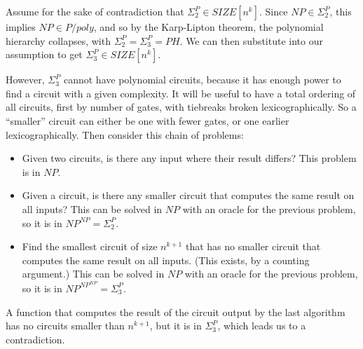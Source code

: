 \documentclass{article}
\newenvironment{problem}[2][Problem]{\begin{trivlist}
\item[\hskip \labelsep {\bfseries #1}\hskip \labelsep {\bfseries #2.}]}{\end{trivlist}}
\begin{document}
\begin{problem}{4}
  Assume for the sake of contradiction that $\Sigma_2^P \in
  SIZE[n^k]$. Since $NP \in \Sigma_2^P$, this implies $NP \in P/poly$,
  and so by the Karp-Lipton theorem, the polynomial hierarchy
  collapses, with $\Sigma_2^P = \Sigma_3^P = PH$. We can then
  substitute into our assumption to get $\Sigma_3^P \in SIZE[n^k]$.

  However, $\Sigma_3^P$ cannot have polynomial circuits, because it
  has enough power to find a circuit with a given complexity. It will
  be useful to have a total ordering of all circuits, first by number
  of gates, with tiebreaks broken lexicographically. So a ``smaller''
  circuit can either be one with fewer gates, or one earlier
  lexicographically.
  Then consider this chain of problems:

  \begin{itemize}
    \item Given two circuits, is there any input where their result
      differs? This problem is in $NP$.
    \item Given a circuit, is there any smaller circuit
      that computes the same result on all inputs? This can be
      solved in $NP$ with an oracle for the previous problem, so it
      is in $NP^{NP} = \Sigma_2^P$.
    \item Find the smallest circuit of size $n^{k+1}$ that has no
      smaller circuit that computes the same result on all
      inputs. (This exists, by a counting argument.) This can be
      solved in $NP$ with an oracle for the previous problem, so it
      is in $NP^{{NP}^{NP}} = \Sigma_3^P$.
  \end{itemize}

  A function that computes the result of the circuit output by the
  last algorithm has no circuits smaller than $n^{k+1}$, but it is in
  $\Sigma_3^P$, which leads us to a contradiction.
\end{problem}
\end{document}
